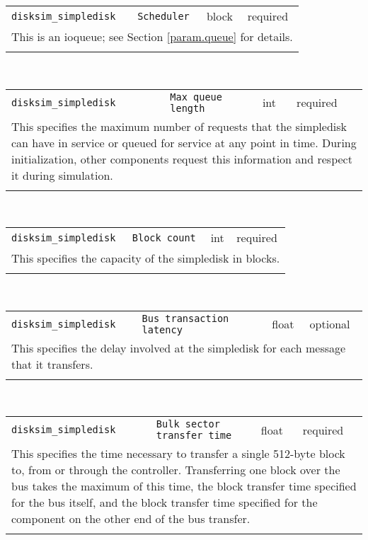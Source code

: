 \noindent 
\begin{tabular}{|p{\lpmodwidth}|p{\lpnamewidth}|p{0.5in}|p{0.5in}|}
\cline{1-4}
\texttt{disksim\_simpledisk} & \texttt{Scheduler} & block & required \\ 
\cline{1-4}
\multicolumn{4}{|p{6in}|}{
This is an ioqueue; see Section \ref{param.queue} for details.
}\\ 
\cline{1-4}
\multicolumn{4}{p{5in}}{}\\
\end{tabular}\\ 
\noindent 
\begin{tabular}{|p{\lpmodwidth}|p{\lpnamewidth}|p{0.5in}|p{0.5in}|}
\cline{1-4}
\texttt{disksim\_simpledisk} & \texttt{Max queue length} & int & required \\ 
\cline{1-4}
\multicolumn{4}{|p{6in}|}{
This specifies the maximum number of requests that the simpledisk can have
in service or queued for service at any point in time. During
initialization, other components request this information and respect
it during simulation.
}\\ 
\cline{1-4}
\multicolumn{4}{p{5in}}{}\\
\end{tabular}\\ 
\noindent 
\begin{tabular}{|p{\lpmodwidth}|p{\lpnamewidth}|p{0.5in}|p{0.5in}|}
\cline{1-4}
\texttt{disksim\_simpledisk} & \texttt{Block count} & int & required \\ 
\cline{1-4}
\multicolumn{4}{|p{6in}|}{
This specifies the capacity of the simpledisk in blocks.
}\\ 
\cline{1-4}
\multicolumn{4}{p{5in}}{}\\
\end{tabular}\\ 
\noindent 
\begin{tabular}{|p{\lpmodwidth}|p{\lpnamewidth}|p{0.5in}|p{0.5in}|}
\cline{1-4}
\texttt{disksim\_simpledisk} & \texttt{Bus transaction latency} & float & optional \\ 
\cline{1-4}
\multicolumn{4}{|p{6in}|}{
This specifies the delay involved at the simpledisk for each message that
it transfers.
}\\ 
\cline{1-4}
\multicolumn{4}{p{5in}}{}\\
\end{tabular}\\ 
\noindent 
\begin{tabular}{|p{\lpmodwidth}|p{\lpnamewidth}|p{0.5in}|p{0.5in}|}
\cline{1-4}
\texttt{disksim\_simpledisk} & \texttt{Bulk sector transfer time} & float & required \\ 
\cline{1-4}
\multicolumn{4}{|p{6in}|}{
This specifies the time necessary to transfer a single 512-byte block to,
from or through the controller. Transferring one block over the bus
takes the maximum of this time, the block transfer time specified for
the bus itself, and the block transfer time specified for the
component on the other end of the bus transfer.
}\\ 
\cline{1-4}
\multicolumn{4}{p{5in}}{}\\
\end{tabular}\\ 
